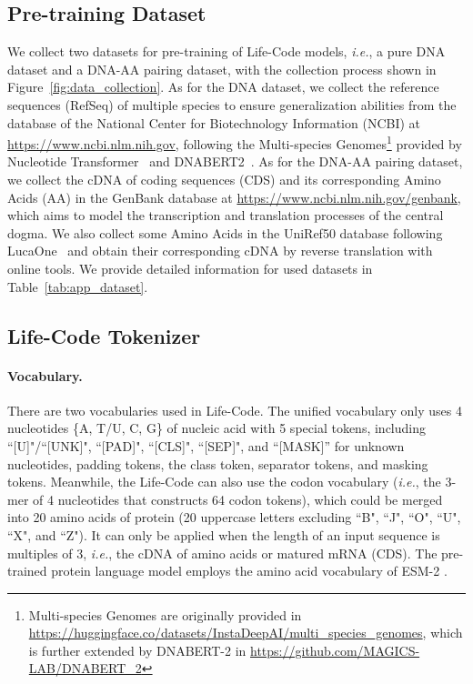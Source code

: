 \subsection{Pre-training Dataset}
We collect two datasets for pre-training of Life-Code models, \textit{i.e.}, a pure DNA dataset and a DNA-AA pairing dataset, with the collection process shown in Figure~\ref{fig:data_collection}.
As for the DNA dataset, we collect the reference sequences (RefSeq) of multiple species to ensure generalization abilities from the database of the National Center for Biotechnology Information (NCBI) at \url{https://www.ncbi.nlm.nih.gov}, following the Multi-species Genomes\footnote{Multi-species Genomes are originally provided in \url{https://huggingface.co/datasets/InstaDeepAI/multi_species_genomes}, which is further extended by DNABERT-2 in \url{https://github.com/MAGICS-LAB/DNABERT_2}} provided by Nucleotide Transformer~\citep{NM2023NucleotideTrans} and DNABERT2~\citep{iclr2024dnabert2}.
As for the DNA-AA pairing dataset, we collect the cDNA of coding sequences (CDS) and its corresponding Amino Acids (AA) in the GenBank database at \url{https://www.ncbi.nlm.nih.gov/genbank}, which aims to model the transcription and translation processes of the central dogma. We also collect some Amino Acids in the UniRef50 database following LucaOne~\citep{he2024lucaone} and obtain their corresponding cDNA by reverse translation with online tools.
We provide detailed information for used datasets in Table~\ref{tab:app_dataset}.


\subsection{Life-Code Tokenizer}
\label{app:impl_tokenizer}
\paragraph{Vocabulary.}
There are two vocabularies used in Life-Code. The unified vocabulary only uses 4 nucleotides \{A, T/U, C, G\} of nucleic acid with 5 special tokens, including ``[U]"/``[UNK]", ``[PAD]", ``[CLS]", ``[SEP]", and “[MASK]” for unknown nucleotides, padding tokens, the class token, separator tokens, and masking tokens. Meanwhile, the Life-Code can also use the codon vocabulary (\textit{i.e.}, the 3-mer of 4 nucleotides that constructs 64 codon tokens), which could be merged into 20 amino acids of protein (20 uppercase letters excluding ``B", ``J", ``O", ``U", ``X", and ``Z"). It can only be applied when the length of an input sequence is multiples of 3, \textit{i.e.}, the cDNA of amino acids or matured mRNA (CDS). The pre-trained protein language model employs the amino acid vocabulary of ESM-2 \citep{lin2022ESM2}.

